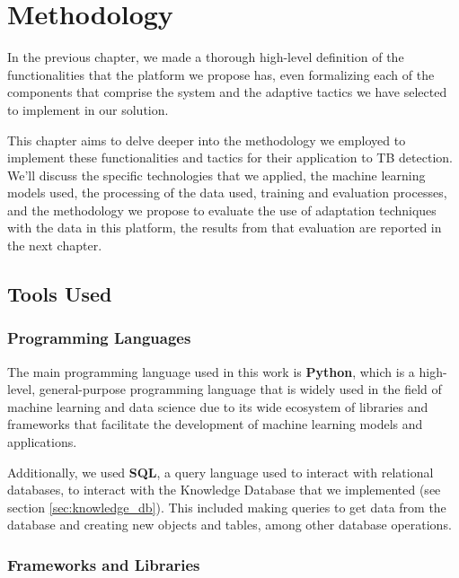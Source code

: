 \documentclass[../main.tex]{subfiles}
\begin{document}
\chapter{Methodology} \label{chap:methodology}

 In the previous chapter, we made a thorough high-level definition of the functionalities that the platform we propose has, even formalizing each of the components that comprise the system and the adaptive tactics we have selected to implement in our solution.

 This chapter aims to delve deeper into the methodology we employed to implement these functionalities and tactics for their application to TB detection. We'll discuss the specific technologies that we applied, the machine learning models used, the processing of the data used, training and evaluation processes, and the methodology we propose to evaluate the use of adaptation techniques with the data in this platform, the results from that evaluation are reported in the next chapter.

\vspace{-0.2cm}
 \section{Tools Used}
    \vspace{-0.3cm}
    \subsection{Programming Languages}

    The main programming language used in this work is \textbf{Python}, which is a high-level, general-purpose programming language that is widely used in the field of machine learning and data science due to its wide ecosystem of libraries and frameworks that facilitate the development of machine learning models and applications.

    Additionally, we used \textbf{SQL}, a query language used to interact with relational databases, to interact with the Knowledge Database that we implemented (see section \ref{sec:knowledge_db}). This included making queries to get data from the database and creating new objects and tables, among other database operations.

    \subsection{Frameworks and Libraries}
\end{document}
